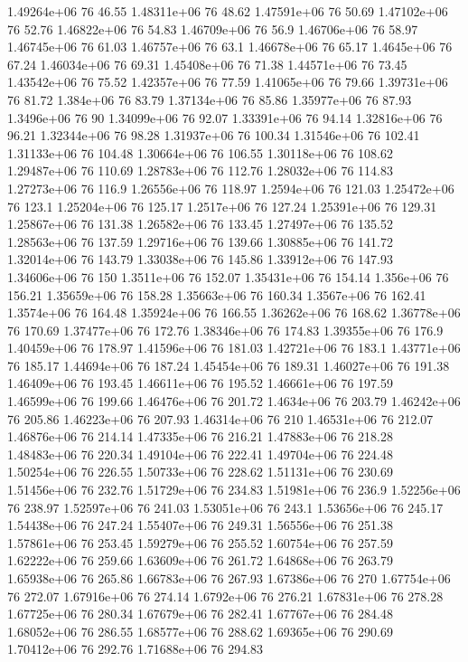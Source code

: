 1.49264e+06 76 46.55
1.48311e+06 76 48.62
1.47591e+06 76 50.69
1.47102e+06 76 52.76
1.46822e+06 76 54.83
1.46709e+06 76 56.9
1.46706e+06 76 58.97
1.46745e+06 76 61.03
1.46757e+06 76 63.1
1.46678e+06 76 65.17
1.4645e+06 76 67.24
1.46034e+06 76 69.31
1.45408e+06 76 71.38
1.44571e+06 76 73.45
1.43542e+06 76 75.52
1.42357e+06 76 77.59
1.41065e+06 76 79.66
1.39731e+06 76 81.72
1.384e+06 76 83.79
1.37134e+06 76 85.86
1.35977e+06 76 87.93
1.3496e+06 76 90
1.34099e+06 76 92.07
1.33391e+06 76 94.14
1.32816e+06 76 96.21
1.32344e+06 76 98.28
1.31937e+06 76 100.34
1.31546e+06 76 102.41
1.31133e+06 76 104.48
1.30664e+06 76 106.55
1.30118e+06 76 108.62
1.29487e+06 76 110.69
1.28783e+06 76 112.76
1.28032e+06 76 114.83
1.27273e+06 76 116.9
1.26556e+06 76 118.97
1.2594e+06 76 121.03
1.25472e+06 76 123.1
1.25204e+06 76 125.17
1.2517e+06 76 127.24
1.25391e+06 76 129.31
1.25867e+06 76 131.38
1.26582e+06 76 133.45
1.27497e+06 76 135.52
1.28563e+06 76 137.59
1.29716e+06 76 139.66
1.30885e+06 76 141.72
1.32014e+06 76 143.79
1.33038e+06 76 145.86
1.33912e+06 76 147.93
1.34606e+06 76 150
1.3511e+06 76 152.07
1.35431e+06 76 154.14
1.356e+06 76 156.21
1.35659e+06 76 158.28
1.35663e+06 76 160.34
1.3567e+06 76 162.41
1.3574e+06 76 164.48
1.35924e+06 76 166.55
1.36262e+06 76 168.62
1.36778e+06 76 170.69
1.37477e+06 76 172.76
1.38346e+06 76 174.83
1.39355e+06 76 176.9
1.40459e+06 76 178.97
1.41596e+06 76 181.03
1.42721e+06 76 183.1
1.43771e+06 76 185.17
1.44694e+06 76 187.24
1.45454e+06 76 189.31
1.46027e+06 76 191.38
1.46409e+06 76 193.45
1.46611e+06 76 195.52
1.46661e+06 76 197.59
1.46599e+06 76 199.66
1.46476e+06 76 201.72
1.4634e+06 76 203.79
1.46242e+06 76 205.86
1.46223e+06 76 207.93
1.46314e+06 76 210
1.46531e+06 76 212.07
1.46876e+06 76 214.14
1.47335e+06 76 216.21
1.47883e+06 76 218.28
1.48483e+06 76 220.34
1.49104e+06 76 222.41
1.49704e+06 76 224.48
1.50254e+06 76 226.55
1.50733e+06 76 228.62
1.51131e+06 76 230.69
1.51456e+06 76 232.76
1.51729e+06 76 234.83
1.51981e+06 76 236.9
1.52256e+06 76 238.97
1.52597e+06 76 241.03
1.53051e+06 76 243.1
1.53656e+06 76 245.17
1.54438e+06 76 247.24
1.55407e+06 76 249.31
1.56556e+06 76 251.38
1.57861e+06 76 253.45
1.59279e+06 76 255.52
1.60754e+06 76 257.59
1.62222e+06 76 259.66
1.63609e+06 76 261.72
1.64868e+06 76 263.79
1.65938e+06 76 265.86
1.66783e+06 76 267.93
1.67386e+06 76 270
1.67754e+06 76 272.07
1.67916e+06 76 274.14
1.6792e+06 76 276.21
1.67831e+06 76 278.28
1.67725e+06 76 280.34
1.67679e+06 76 282.41
1.67767e+06 76 284.48
1.68052e+06 76 286.55
1.68577e+06 76 288.62
1.69365e+06 76 290.69
1.70412e+06 76 292.76
1.71688e+06 76 294.83
